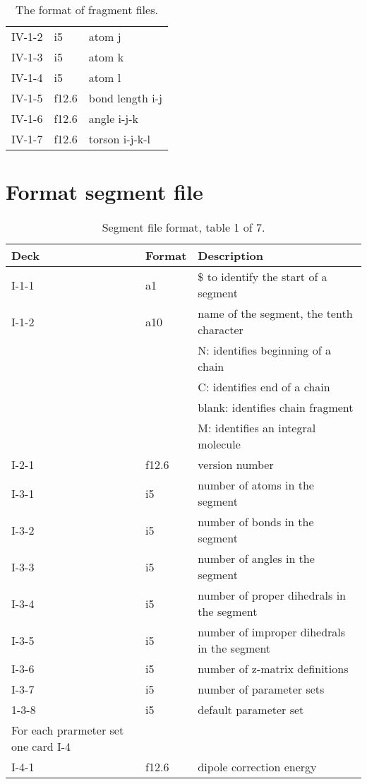 \begin{table}[h]
\begin{center}
\begin{tabular*}{150mm}{p{15mm}p{12mm}l}
IV-1-2 & i5    & atom j \\
IV-1-3 & i5    & atom k \\
IV-1-4 & i5    & atom l \\
IV-1-5 & f12.6 & bond length i-j\\
IV-1-6 & f12.6 & angle i-j-k\\
IV-1-7 & f12.6 & torson i-j-k-l\\
\hline\hline
\end{tabular*}
\caption{The format of fragment files.\label{tbl:nwmdfrg}}
\end{center}
\end{table}

\section {Format segment file}

\begin{table}[h]
\begin{center}
\begin{tabular*}{150mm}{p{15mm}p{12mm}l}
\hline\hline
Deck  & Format & Description \\ \hline
I-1-1 & a1     & \$ to identify the start of a segment \\ %
I-1-2 & a10    & name of the segment, the tenth character\\
      &        & N: identifies beginning of a chain\\
      &        & C: identifies end of a chain\\
      &        & blank: identifies chain fragment\\
      &        & M: identifies an integral molecule\\
\hline
I-2-1 & f12.6  & version number \\
\hline
I-3-1 & i5     & number of atoms in the segment\\
I-3-2 & i5     & number of bonds in the segment\\
I-3-3 & i5     & number of angles in the segment\\
I-3-4 & i5     & number of proper dihedrals in the segment\\
I-3-5 & i5     & number of improper dihedrals in the segment\\
I-3-6 & i5     & number of z-matrix definitions\\
I-3-7 & i5     & number of parameter sets \\
1-3-8 & i5     & default parameter set\\
\hline
For each prarmeter set one card I-4\\
\hline
I-4-1 & f12.6  & dipole correction energy \\
\hline
\end{tabular*}
\caption{Segment file format, table 1 of 7.\label{tbl:nwmdseg1}}
\end{center}
\end{table}

